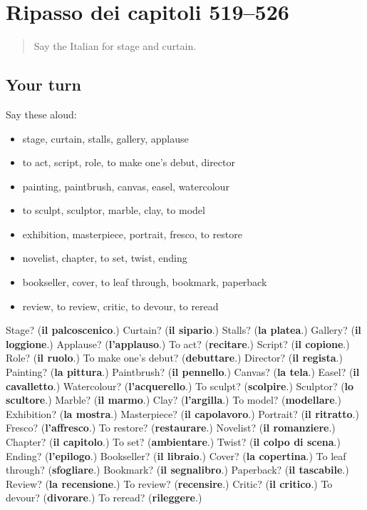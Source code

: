 \section[(dialogue)]{Ripasso dei capitoli 519–526}

\label{lesson:IT-R526-ripasso-519-526}



\begin{quote}
Say the Italian for stage and curtain.
\end{quote}

\subsection*{Your turn}
Say these aloud:

\begin{itemize}
\raggedright
  \item stage, curtain, stalls, gallery, applause
  \item to act, script, role, to make one's debut, director
  \item painting, paintbrush, canvas, easel, watercolour
  \item to sculpt, sculptor, marble, clay, to model
  \item exhibition, masterpiece, portrait, fresco, to restore
  \item novelist, chapter, to set, twist, ending
  \item bookseller, cover, to leaf through, bookmark, paperback
  \item review, to review, critic, to devour, to reread
\end{itemize}

\begin{tcolorbox}[breakable,colback=teal!4,colframe=teal!35!black,title={Before you move on}]
Stage? (\textbf{il palcoscenico}.) Curtain? (\textbf{il sipario}.) Stalls? (\textbf{la platea}.) Gallery? (\textbf{il loggione}.) Applause? (\textbf{l'applauso}.) To act? (\textbf{recitare}.) Script? (\textbf{il copione}.) Role? (\textbf{il ruolo}.) To make one's debut? (\textbf{debuttare}.) Director? (\textbf{il regista}.) Painting? (\textbf{la pittura}.) Paintbrush? (\textbf{il pennello}.) Canvas? (\textbf{la tela}.) Easel? (\textbf{il cavalletto}.) Watercolour? (\textbf{l'acquerello}.) To sculpt? (\textbf{scolpire}.) Sculptor? (\textbf{lo scultore}.) Marble? (\textbf{il marmo}.) Clay? (\textbf{l'argilla}.) To model? (\textbf{modellare}.) Exhibition? (\textbf{la mostra}.) Masterpiece? (\textbf{il capolavoro}.) Portrait? (\textbf{il ritratto}.) Fresco? (\textbf{l'affresco}.) To restore? (\textbf{restaurare}.) Novelist? (\textbf{il romanziere}.) Chapter? (\textbf{il capitolo}.) To set? (\textbf{ambientare}.) Twist? (\textbf{il colpo di scena}.) Ending? (\textbf{l'epilogo}.) Bookseller? (\textbf{il libraio}.) Cover? (\textbf{la copertina}.) To leaf through? (\textbf{sfogliare}.) Bookmark? (\textbf{il segnalibro}.) Paperback? (\textbf{il tascabile}.) Review? (\textbf{la recensione}.) To review? (\textbf{recensire}.) Critic? (\textbf{il critico}.) To devour? (\textbf{divorare}.) To reread? (\textbf{rileggere}.)
\end{tcolorbox}
